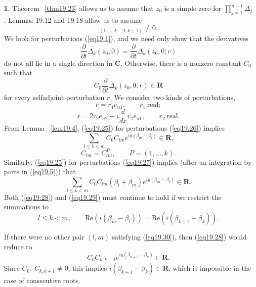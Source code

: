 \documentclass{surv-l}
\theoremstyle{plain}
\theoremstyle{definition}
\newtheorem*{pf}{\sc{Proof}}
\numberwithin{equation}{chapter}
\begin{document}
\begin{pf}
Theorem ~\ref{thm19.23} allows us to assume that $z_{0}$ is a simple zero for $\prod_{j=1}^{n-1}\Delta_{j}$. Lemmas 19.12 and 19.18 allow us to assume
\begin{equation*}
[f_{k}^{+}(z_{0})]_{(1,\ldots,k-1,k+1)}\neq 0.
\end{equation*}
We look for perturbations (\ref{eq19.1}), and we need only show that the derivatives
\begin{equation*}
\frac{\partial}{\partial t}\Delta_{k}(z_{0},0)=\frac{\partial}{\partial t}\Delta_{k}(z_{0},0;r)
\end{equation*}
do not all lie in a single direction in $\mathbf{C}$. Otherwise, there is a nonzero constant $C_{0}$ such that
\setcounter{equation}{24}
\begin{equation}\label{eq19.25}
C_{0}\frac{\partial}{\partial t}\Delta_{k}(z_{0},0;r)\in \mathbf{R}
\end{equation}
for every selfadjoint perturbation $r$. We consider two kinds of perturbations,
\begin{equation}\label{eq19.26}
r=r_{1}e_{n1}, \qquad  r_{1}\ \mathrm{real};
\end{equation}
\begin{equation}\label{eq19.27}
r=2r_{2}e_{n2}-i\frac{d}{dx}r_{2}e_{n1}, \qquad r_{2}\ \mathrm{real}.
\end{equation}
From Lemma ~\ref{lem19.4}, (\ref{eq19.25}) for perturbations (\ref{eq19.26}) implies
\begin{equation}\label{eq19.28}
\sum_{l\leq k<m}C_{0}C_{lm}e^{iy(\beta_{m}-\beta_{l})} \in \mathbf{R},
\end{equation}
\begin{equation*}
C_{lm}=C_{lm}^{P},\qquad P=(1, \ldots, k).
\end{equation*}
Similarly, (\ref{eq19.25}) for perturbations (\ref{eq19.27}) implies (after an integration by parts in (\ref{eq19.5})) that
\begin{equation}\label{eq19.29}
\sum_{l\leq k<m}C_{0}C_{lm}(\beta_{l}+\beta_{m})e^{iy(\beta_{m}-\beta_{l})}\in \mathbf{R}.
\end{equation}
Both (\ref{eq19.28}) and (\ref{eq19.29}) must continue to hold if we restrict the summations to
\begin{equation}\label{eq19.30}
l\leq k<m,\qquad \mathrm{Re}(i(\beta_{m}-\beta_{l}))=\mathrm{Re}(i(\beta_{k+1}-\beta_{k})).
\end{equation}

If there were no other pair $(l,m)$ satisfying (\ref{eq19.30}), then (\ref{eq19.28}) would reduce to
\begin{equation*}
C_{0}C_{k,k+1}e^{iy(\beta_{k+1}-\beta_{k})}\in \mathbf{R}.
\end{equation*}
Since $C_{0},\ C_{k,k+1}\neq 0$, this implies $i(\beta_{k+1}-\beta_{k})\in \mathbf{R}$, which is impossible in the case of consecutive roots.


\end{pf}
\end{document}
